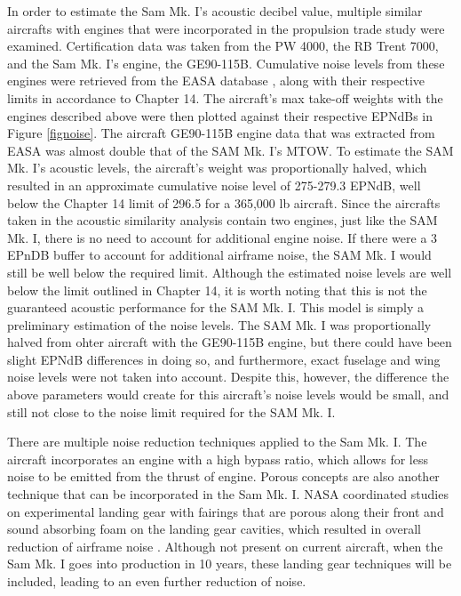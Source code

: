 In order to estimate the Sam Mk. I's acoustic decibel value, multiple similar aircrafts with engines that were incorporated in the propulsion trade study were examined. Certification data was taken from the PW 4000, the RB Trent 7000, and the Sam Mk. I's engine, the GE90-115B. Cumulative noise levels from these engines were retrieved from the EASA database \cite{easa}, along with their respective limits in accordance to Chapter 14. The aircraft's max take-off weights with the engines described above were then plotted against their respective EPNdBs in Figure \ref{fignoise}. The aircraft GE90-115B engine data that was extracted from EASA \cite{easa} was almost double that of the SAM Mk. I's MTOW. To estimate the SAM Mk. I's acoustic levels, the aircraft's weight was proportionally halved, which resulted in an approximate cumulative noise level of 275-279.3 EPNdB, well below the Chapter 14 limit of 296.5 for a 365,000 lb aircraft. Since the aircrafts taken in the acoustic similarity analysis contain two engines, just like the SAM Mk. I, there is no need to account for additional engine noise. If there were a 3 EPnDB buffer to account for additional airframe noise, the SAM Mk. I would still be well below the required limit. Although the estimated noise levels are well below the limit outlined in Chapter 14, it is worth noting that this is not the guaranteed acoustic performance for the SAM Mk. I. This model is simply a preliminary estimation of the noise levels. The SAM Mk. I was proportionally halved from ohter aircraft with the GE90-115B engine, but there could have been slight EPNdB differences in doing so, and furthermore, exact fuselage and wing noise levels were not taken into account. Despite this, however, the difference the above parameters would create for this aircraft's noise levels would be small, and still not close to the noise limit required for the SAM Mk. I. 

There are multiple noise reduction techniques applied to the Sam Mk. I. The aircraft incorporates an engine with a high bypass ratio, which allows for less noise to be emitted from the thrust of engine. Porous concepts are also another technique that can be incorporated in the Sam Mk. I. NASA coordinated studies on experimental landing gear with fairings that are porous along their front and sound absorbing foam on the landing gear cavities, which resulted in overall reduction of airframe noise \cite{noise_reduction}. Although not present on current aircraft, when the Sam Mk. I goes into production in 10 years, these landing gear techniques will be included, leading to an even further reduction of noise. 